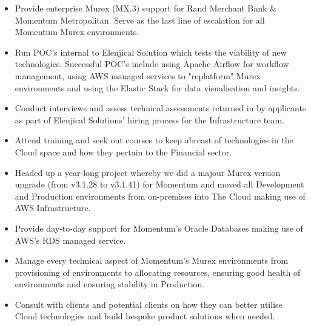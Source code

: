 \documentclass[10pt,a4paper]{altacv}
\begin{document}

\makecvheader


\begin{paracol}{2}

\begin{itemize}
    \item Provide enterprise Murex (MX.3) support for Rand Merchant Bank \& Momentum Metropolitan. Serve as the last line of escalation for all Momentum Murex environments.
    \item Run POC's internal to Elenjical Solution which tests the viability of new technologies. Successful POC's include using Apache Airflow for workflow management, using AWS managed services to "replatform" Murex environments and using the Elastic Stack for data visualisation and insights.
    \item Conduct interviews and assess technical assessments returned in by applicants as part of Elenjical Solutions' hiring process for the Infrastructure team.
    \item Attend training and seek out courses to keep abreast of technologies in the Cloud space and how they pertain to the Financial sector.
    \item Headed up a year-long project whereby we did a majour Murex version upgrade (from v3.1.28 to v3.1.41) for Momentum and moved all Development and Production environments from on-premises into The Cloud making use of AWS Infrastructure.
    \item Provide day-to-day support for Momentum's Oracle Databases making use of AWS's RDS managed service.
    \item Manage every technical aspect of Momentum's Murex environments from provisioning of environments to allocating resources, ensuring good health of environments and ensuring stability in Production.
    \item Consult with clients and potential clients on how they can better utilise Cloud technologies and build bespoke product solutions when needed.

\end{itemize}
\end{paracol}
\end{document}

